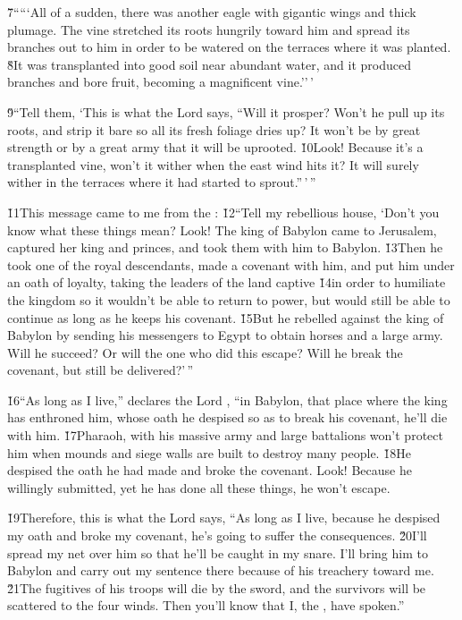 \v{7}`````All of a sudden, there was another eagle with gigantic wings and thick plumage. The vine stretched its roots hungrily toward him and spread its branches out to him in order to be watered on the terraces where it was planted. \v{8}It was transplanted into good soil near abundant water, and it produced branches and bore fruit, becoming a magnificent vine.''\,'

\v{9}``Tell them, `This is what the Lord  says, ``Will it prosper? Won't he pull up its roots, and strip it bare so all its fresh foliage dries up? It won't be by great strength or by a great army that it will be uprooted. \v{10}Look! Because it's a transplanted vine, won't it wither when the east wind hits it? It will surely wither in the terraces where it had started to sprout.''\,'\,''

\v{11}This message came to me from the : \v{12}``Tell my rebellious house, `Don't you know what these things mean? Look! The king of Babylon came to Jerusalem, captured her king and princes, and took them with him to Babylon. \v{13}Then he took one of the royal descendants, made a covenant with him, and put him under an oath of loyalty, taking the leaders of the land captive \v{14}in order to humiliate the kingdom so it wouldn't be able to return to power, but would still be able to continue as long as he keeps his covenant. \v{15}But he rebelled against the king of Babylon by sending his messengers to Egypt to obtain horses and a large army. Will he succeed? Or will the one who did this escape? Will he break the covenant, but still be delivered?'\,''

\v{16}``As long as I live,'' declares the Lord , ``in Babylon, that place where the king has enthroned him, whose oath he despised so as to break his covenant, he'll die with him. \v{17}Pharaoh, with his massive army and large battalions won't protect him when mounds and siege walls are built to destroy many people. \v{18}He despised the oath he had made and broke the covenant. Look! Because he willingly submitted, yet he has done all these things, he won't escape.

\v{19}Therefore, this is what the Lord  says, ``As long as I live, because he despised my oath and broke my covenant, he's going to suffer the consequences. \v{20}I'll spread my net over him so that he'll be caught in my snare. I'll bring him to Babylon and carry out my sentence there because of his treachery toward me. \v{21}The fugitives of his troops will die by the sword, and the survivors will be scattered to the four winds. Then you'll know that I, the , have spoken.''

